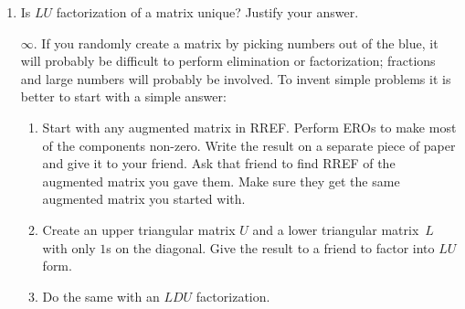 \begin{enumerate}
\item Is $LU$ factorization of a matrix unique?  Justify your answer.


\item[$\infty$.] If you randomly create a matrix by picking numbers out of the blue, it will probably be difficult to perform elimination or factorization; fractions and large numbers will probably be involved. To invent simple problems it is better to start with a simple answer:
\begin{enumerate}
\item Start with any augmented matrix in RREF. Perform EROs to make most of the components non-zero. Write the result on a separate piece of paper and give it to your friend. Ask that friend to find RREF of the augmented matrix you gave them. Make sure they get the same augmented matrix you started with.  
\item Create  an upper triangular matrix $U$ and a lower triangular matrix~$L$ with only $1$s on the diagonal. Give the result to a friend to factor into $LU$ form. 
\item Do the same with an $LDU$ factorization. 
\end{enumerate}
\end{enumerate}


